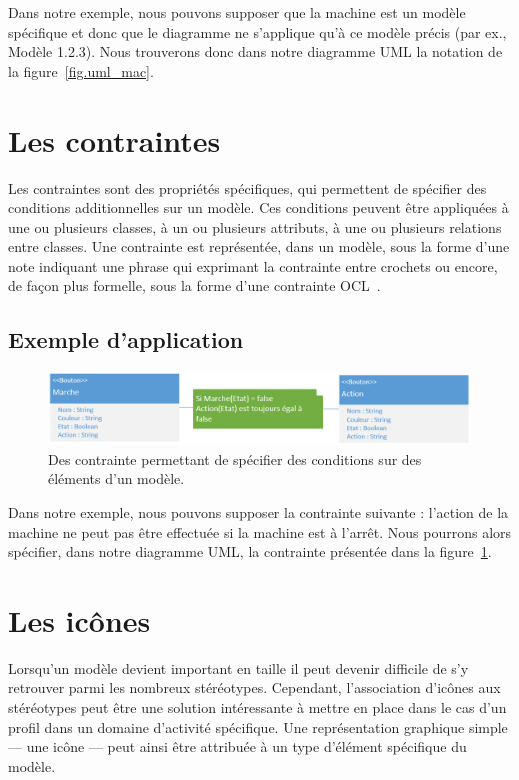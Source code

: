 Dans notre exemple, nous pouvons supposer que la machine est un modèle spécifique et donc que le diagramme ne s'applique qu'à ce modèle précis (par ex., Modèle 1.2.3).
Nous trouverons donc dans notre diagramme UML la notation de la figure~\ref{fig.uml_mac}.



\section{Les contraintes}
Les contraintes sont des propriétés spécifiques, qui permettent de sp\'ecifier des conditions additionnelles sur un modèle.
Ces conditions peuvent être appliquées à une ou plusieurs classes, à un ou plusieurs attributs, à une ou plusieurs relations entre classes.
Une contrainte est représent\'ee, dans un modèle, sous la forme d'une note indiquant une phrase qui exprimant la contrainte entre crochets ou encore, de fa\c{c}on plus formelle, sous la forme d'une contrainte OCL~\cite{OCL}.

\subsection{Exemple d'application}

\begin{figure}
    \begin{center}
    \includegraphics[width=12cm]{10_img/chap4/constraint.PNG}
    \caption{Des contrainte permettant de sp\'ecifier des conditions sur des \'el\'ements d'un modèle.}
    \label{fig.uml_con}
    \end{center}
\end{figure}

Dans notre exemple, nous pouvons supposer la contrainte suivante : l'action de la machine ne peut pas être effectuée si la machine est à l'arrêt.
Nous pourrons alors sp\'ecifier, dans notre diagramme UML, la contrainte présent\'ee dans la figure~\ref{fig.uml_con}.


\section{Les ic\^ones}
Lorsqu'un modèle devient important en taille il peut devenir difficile de s'y retrouver parmi les nombreux st\'er\'eotypes.
Cependant, l'association d'ic\^ones aux st\'er\'eotypes peut être une solution int\'eressante à mettre en place dans le cas d'un profil dans un domaine d'activité spécifique.
Une représentation graphique simple --- une ic\^one --- peut ainsi être attribuée à un type d'élément spécifique du modèle.

